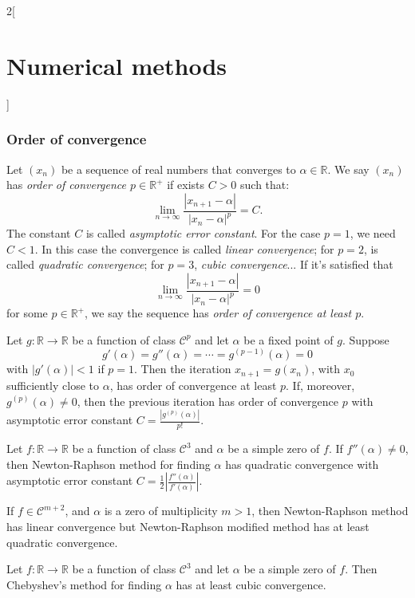 \documentclass[../../../main.tex]{subfiles}
\begin{document}
\begin{multicols}{2}[\section{Numerical methods}]
\subsubsection*{Order of convergence}
\begin{definition}
    Let $(x_n)$ be a sequence of real numbers that converges to $\alpha\in\mathbb{R}$. We say $(x_n)$ has \textit{order of convergence $p\in\mathbb{R}^+$} if exists $C>0$ such that: $$\lim_{n\to\infty}\frac{|x_{n+1}-\alpha|}{|x_n-\alpha|^p}=C.$$ The constant $C$ is called \textit{asymptotic error constant}. For the case $p=1$, we need $C<1$. In this case the convergence is called \textit{linear convergence}; for $p=2$, is called \textit{quadratic convergence}; for $p=3$, \textit{cubic convergence}... If it's satisfied that $$\lim_{n\to\infty}\frac{|x_{n+1}-\alpha|}{|x_n-\alpha|^p}=0$$ for some $p\in\mathbb{R}^+$, we say the sequence has \textit{order of convergence at least $p$}.
\end{definition}
\begin{theorem}
    Let $g:\mathbb{R}\rightarrow\mathbb{R}$ be a function of class $\mathcal{C}^p$ and let $\alpha$ be a fixed point of $g$. Suppose $$g'(\alpha)=g''(\alpha)=\cdots=g^{(p-1)}(\alpha)=0$$ with $|g'(\alpha)|<1$ if $p=1$. Then the iteration $x_{n+1}=g(x_n)$, with $x_0$ sufficiently close to $\alpha$, has order of convergence at least $p$. If, moreover, $g^{(p)}(\alpha)\ne0$, then the previous iteration has order of convergence $p$ with asymptotic error constant $C=\frac{|g^{(p)}(\alpha)|}{p!}$.
\end{theorem}
\begin{theorem}
    Let $f:\mathbb{R}\rightarrow\mathbb{R}$ be a function of class $\mathcal{C}^3$ and $\alpha$ be a simple zero of $f$. If $f''(\alpha)\ne0$, then Newton-Raphson method for finding $\alpha$ has quadratic convergence with asymptotic error constant $C=\frac{1}{2}\left|\frac{f''(\alpha)}{f'(\alpha)}\right|$.\par If $f\in\mathcal{C}^{m+2}$, and $\alpha$ is a zero of multiplicity $m>1$, then Newton-Raphson method has linear convergence but Newton-Raphson modified method has at least quadratic convergence.
\end{theorem}
\begin{theorem}
    Let $f:\mathbb{R}\rightarrow\mathbb{R}$ be a function of class $\mathcal{C}^3$ and let $\alpha$ be a simple zero of $f$. Then Chebyshev's method for finding $\alpha$ has at least cubic convergence.
\end{theorem}

\end{multicols}
\end{document}
